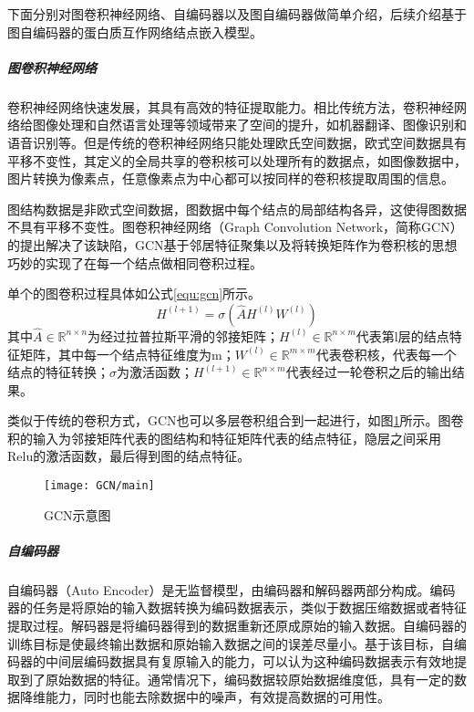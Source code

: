 下面分别对图卷积神经网络、自编码器以及图自编码器做简单介绍，后续介绍基于图自编码器的蛋白质互作网络结点嵌入模型。

\subparagraph{图卷积神经网络}

卷积神经网络快速发展，其具有高效的特征提取能力。相比传统方法，卷积神经网络给图像处理和自然语言处理等领域带来了空间的提升，如机器翻译、图像识别和语音识别等。但是传统的卷积神经网络只能处理欧氏空间数据，欧式空间数据具有平移不变性，其定义的全局共享的卷积核可以处理所有的数据点，如图像数据中，图片转换为像素点，任意像素点为中心都可以按同样的卷积核提取周围的信息。

图结构数据是非欧式空间数据，图数据中每个结点的局部结构各异，这使得图数据不具有平移不变性。图卷积神经网络（Graph Convolution Network，简称GCN）的提出解决了该缺陷，GCN基于邻居特征聚集以及将转换矩阵作为卷积核的思想巧妙的实现了在每一个结点做相同卷积过程。

单个的图卷积过程具体如公式\ref{equ:gcn}所示。
\begin{equation}
    \label{equ:gcn}
    H^{(l+1)}=\sigma (\hat{A}H^{(l)}W^{(l)})
\end{equation}
其中$\hat{A}\in \mathbb{R}^{n\times n} $为经过拉普拉斯平滑的邻接矩阵；$H^{(l)}\in \mathbb{R}^{n\times m} $代表第l层的结点特征矩阵，其中每一个结点特征维度为m；$W^{(l)}\in \mathbb{R}^{m\times m} $代表卷积核，代表每一个结点的特征转换；$\sigma $为激活函数；$H^{(l+1)}\in \mathbb{R}^{n\times m} $代表经过一轮卷积之后的输出结果。

类似于传统的卷积方式，GCN也可以多层卷积组合到一起进行，如图\ref{fig:GCN/main}所示。图卷积的输入为邻接矩阵代表的图结构和特征矩阵代表的结点特征，隐层之间采用Relu的激活函数，最后得到图的结点特征。

\begin{figure}[htbp]
    \centering
    \texttt{[image: GCN/main]}
    \caption{GCN示意图}
    \label{fig:GCN/main}
\end{figure}

\subparagraph{自编码器}

自编码器（Auto Encoder）是无监督模型，由编码器和解码器两部分构成。编码器的任务是将原始的输入数据转换为编码数据表示，类似于数据压缩数据或者特征提取过程。解码器是将编码器得到的数据重新还原成原始的输入数据。自编码器的训练目标是使最终输出数据和原始输入数据之间的误差尽量小。基于该目标，自编码器的中间层编码数据具有复原输入的能力，可以认为这种编码数据表示有效地提取到了原始数据的特征。通常情况下，编码数据较原始数据维度低，具有一定的数据降维能力，同时也能去除数据中的噪声，有效提高数据的可用性。

